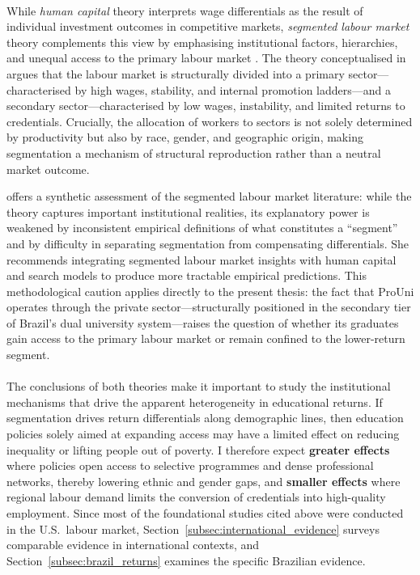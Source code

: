 \paragraph{}
While \emph{human capital} theory interprets wage differentials as the result of individual investment outcomes in competitive markets, \emph{segmented labour market} theory complements this view by emphasising institutional factors, hierarchies, and unequal access to the primary labour market \cite{ReichGordonEdwards1973, DoeringerPiore1971, Leontaridi1998}. The theory conceptualised in  argues that the labour market is structurally divided into a primary sector---characterised by high wages, stability, and internal promotion ladders---and a secondary sector---characterised by low wages, instability, and limited returns to credentials. Crucially, the allocation of workers to sectors is not solely determined by productivity but also by race, gender, and geographic origin, making segmentation a mechanism of structural reproduction rather than a neutral market outcome.

 offers a synthetic assessment of the segmented labour market literature: while the theory captures important institutional realities, its explanatory power is weakened by inconsistent empirical definitions of what constitutes a ``segment'' and by difficulty in separating segmentation from compensating differentials. She recommends integrating segmented labour market insights with human capital and search models to produce more tractable empirical predictions. This methodological caution applies directly to the present thesis: the fact that ProUni operates through the private sector---structurally positioned in the secondary tier of Brazil's dual university system---raises the question of whether its graduates gain access to the primary labour market or remain confined to the lower-return segment.
\paragraph{}
The conclusions of both theories make it important to study the institutional mechanisms that drive the apparent heterogeneity in educational returns. If segmentation drives return differentials along demographic lines, then education policies solely aimed at expanding access may have a limited effect on reducing inequality or lifting people out of poverty. I therefore expect \textbf{greater effects} where policies open access to selective programmes and dense professional networks, thereby lowering ethnic and gender gaps, and \textbf{smaller effects} where regional labour demand limits the conversion of credentials into high-quality employment. Since most of the foundational studies cited above were conducted in the U.S.~labour market, Section~\ref{subsec:international_evidence} surveys comparable evidence in international contexts, and Section~\ref{subsec:brazil_returns} examines the specific Brazilian evidence.




